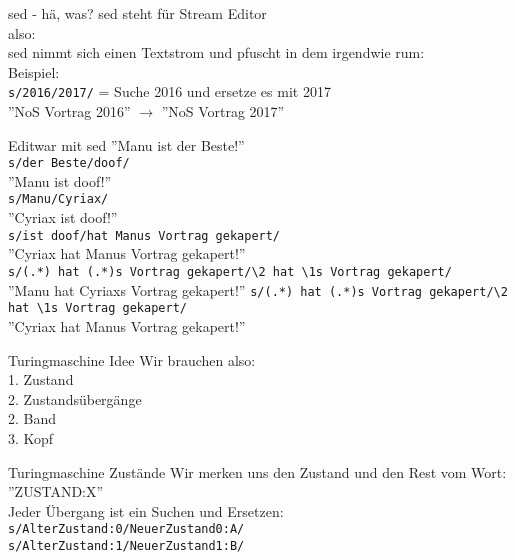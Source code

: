 \newcommand{\bsl}{\textbackslash}

\begin{frame}{sed - h\"a, was?}
	sed steht f\"ur Stream Editor\\
	also:\\
	sed nimmt sich einen Textstrom und pfuscht in dem irgendwie rum:\\
	Beispiel:\\
	\texttt{s/2016/2017/} = Suche 2016 und ersetze es mit 2017\\
	''NoS Vortrag 2016'' $\rightarrow$ ''NoS Vortrag 2017''\\
\end{frame}


\begin{frame}{Editwar mit sed}
	''Manu ist der Beste!''\\
	\quad\quad\texttt{s/der Beste/doof/}\\
	''Manu ist doof!''\\
	\quad\quad\texttt{s/Manu/Cyriax/}\\
	''Cyriax ist doof!''\\
	\quad\quad\texttt{s/ist doof/hat Manus Vortrag gekapert/}\\
	''Cyriax hat Manus Vortrag gekapert!''\\
	\quad\quad\texttt{s/(.*) hat (.*)s Vortrag gekapert/\bsl2 hat \bsl1s Vortrag gekapert/}\\
	''Manu hat Cyriaxs Vortrag gekapert!''
	\quad\quad\texttt{s/(.*) hat (.*)s Vortrag gekapert/\bsl2 hat \bsl1s Vortrag gekapert/}\\
	''Cyriax hat Manus Vortrag gekapert!''
\end{frame}

\begin{frame}{Turingmaschine Idee}
	Wir brauchen also:\\
	1. Zustand\\
	2. Zustands\"uberg\"ange\\
	2. Band\\
	3. Kopf\\
\end{frame}

\begin{frame}{Turingmaschine Zust\"ande}
	Wir merken uns den Zustand und den Rest vom Wort:\\
	''ZUSTAND:X''\\
	Jeder \"Ubergang ist ein Suchen und Ersetzen:\\
	\texttt{s/AlterZustand:0/NeuerZustand0:A/}\\
	\texttt{s/AlterZustand:1/NeuerZustand1:B/}
\end{frame}

